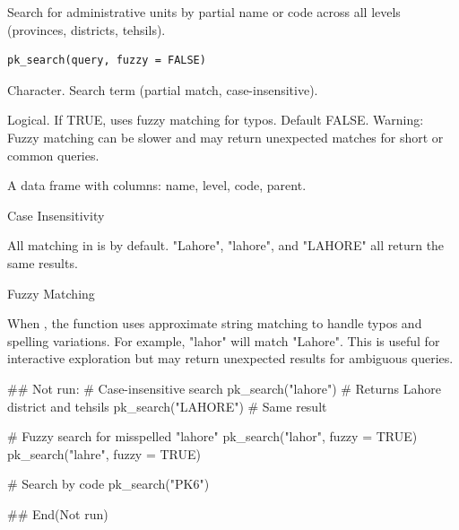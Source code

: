 \documentclass[a4paper]{book}
\begin{document}
%
\begin{Description}
Search for administrative units by partial name or code across
all levels (provinces, districts, tehsils).
\end{Description}
%
\begin{Usage}
\begin{verbatim}
pk_search(query, fuzzy = FALSE)
\end{verbatim}
\end{Usage}
%
\begin{Arguments}
\begin{ldescription}
\item[\code{query}] Character. Search term (partial match, case-insensitive).

\item[\code{fuzzy}] Logical. If TRUE, uses fuzzy matching for typos.
Default FALSE. Warning: Fuzzy matching can be slower and may
return unexpected matches for short or common queries.
\end{ldescription}
\end{Arguments}
%
\begin{Value}
A data frame with columns: name, level, code, parent.
\end{Value}
%
\begin{Section}{Case Insensitivity}

All matching in  is  by default.
"Lahore", "lahore", and "LAHORE" all return the same results.
\end{Section}
%
\begin{Section}{Fuzzy Matching}

When , the function uses approximate string matching
to handle typos and spelling variations. For example, "lahor" will
match "Lahore". This is useful for interactive exploration but
may return unexpected results for ambiguous queries.
\end{Section}
%
\begin{Examples}
\begin{ExampleCode}
## Not run: 
  # Case-insensitive search
  pk_search("lahore")   # Returns Lahore district and tehsils
  pk_search("LAHORE")   # Same result

  # Fuzzy search for misspelled "lahore"
  pk_search("lahor", fuzzy = TRUE)
  pk_search("lahre", fuzzy = TRUE)

  # Search by code
  pk_search("PK6")

## End(Not run)
\end{ExampleCode}
\end{Examples}
\end{document}
